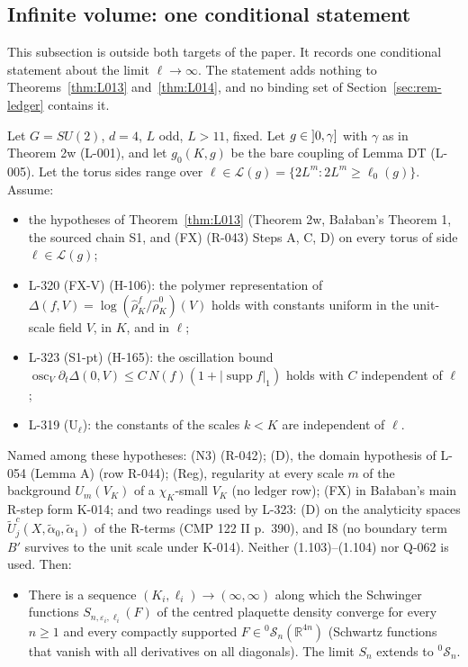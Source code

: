 \subsection{Infinite volume: one conditional statement}\label{sec:infvol}
This subsection is outside both targets of the paper. It records one conditional statement about the limit $\ell\to\infty$. The statement adds nothing to Theorems~\ref{thm:L013} and~\ref{thm:L014}, and no binding set of Section~\ref{sec:rem-ledger} contains it.

\begin{theorem}\label{thm:L196}
Let $G=SU(2)$, $d=4$, $L$ odd, $L>11$, fixed. Let $g\in\mathopen{]}0,\gamma\mathclose{]}$ with $\gamma$ as in Theorem 2w (L-001), and let $g_0(K,g)$ be the bare coupling of Lemma DT (L-005). Let the torus sides range over $\ell\in\mathcal L(g)=\{2L^m:2L^m\ge\ell_0(g)\}$. Assume:
\begin{itemize}
\item[(i)] the hypotheses of Theorem~\ref{thm:L013} (Theorem 2w, Ba{\l}aban's Theorem 1, the sourced chain S1, and (FX) (R-043) Steps A, C, D) on every torus of side $\ell\in\mathcal L(g)$;
\item[(ii)] L-320 (FX-V) (H-106): the polymer representation of $\Delta(f,V)=\log(\hat\rho^f_K/\hat\rho^0_K)(V)$ holds with constants uniform in the unit-scale field $V$, in $K$, and in $\ell$;
\item[(iii)] L-323 (S1-pt) (H-165): the oscillation bound $\operatorname{osc}_V\partial_t\Delta(0,V)\le C\,N(f)(1+|\operatorname{supp}f|_1)$ holds with $C$ independent of $\ell$;
\item[(iv)] L-319 (U$_\ell$): the constants of the scales $k<K$ are independent of $\ell$.
\end{itemize}
Named among these hypotheses: (N3) (R-042); (D), the domain hypothesis of L-054 (Lemma A) (row R-044); (Reg), regularity at every scale $m$ of the background $U_m(V_K)$ of a $\chi_K$-small $V_K$ (no ledger row); (FX) in Ba{\l}aban's main R-step form K-014; and two readings used by L-323: (D) on the analyticity spaces $\tilde U_j^c(X,\tilde\alpha_0,\tilde\alpha_1)$ of the R-terms (CMP 122 II p.~390), and I8 (no boundary term $B'$ survives to the unit scale under K-014). Neither (1.103)--(1.104) nor Q-062 is used. Then:
\begin{itemize}
\item[(a)] There is a sequence $(K_i,\ell_i)\to(\infty,\infty)$ along which the Schwinger functions $S_{n,\varepsilon_i,\ell_i}(F)$ of the centred plaquette density converge for every $n\ge1$ and every compactly supported $F\in{}^0\mathcal S_n(\mathbb R^{4n})$ (Schwartz functions that vanish with all derivatives on all diagonals). The limit $S_n$ extends to ${}^0\mathcal S_n$.

\end{itemize}
\end{theorem}
